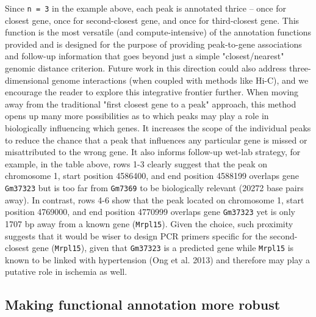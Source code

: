 \documentclass[12pt]{article}
\begin{document}
Since \texttt{n = 3} in the example above, each peak is annotated thrice -- once for closest gene, once for second-closest gene, and once for third-closest gene.  This function is the most versatile (and compute-intensive) of the annotation functions provided and is designed for the purpose of providing peak-to-gene associations and follow-up information that goes beyond just a simple "closest/nearest" genomic distance criterion.  Future work in this direction could also address three-dimensional genome interactions (when coupled with methods like Hi-C), and we encourage the reader to explore this integrative frontier further.  When moving away from the traditional "first closest gene to a peak" approach, this method opens up many more possibilities as to which peaks may play a role in biologically influencing which genes. It increases the scope of the individual peaks to reduce the chance that a peak that influences any particular gene is missed or misattributed to the wrong gene.  It also informs follow-up wet-lab strategy, for example, in the table above, rows 1-3 clearly suggest that the peak on chromosome 1, start position 4586400, and end position 4588199 overlaps gene \texttt{Gm37323} but is too far from \texttt{Gm7369} to be biologically relevant (20272 base pairs away).  In contrast, rows 4-6 show that the peak located on chromosome 1, start position 4769000, and end position 4770999 overlaps gene \texttt{Gm37323} yet is only 1707 bp away from a known gene (\texttt{Mrpl15}).  Given the choice, such proximity suggests that it would be wiser to design PCR primers specific for the second-closest gene (\texttt{Mrpl15}), given that \texttt{Gm37323} is a predicted gene while \texttt{Mrpl15} is known to be linked with hypertension (Ong et al. 2013) and therefore may play a putative role in ischemia as well.  

\subsection{Making functional annotation more robust}
\end{document}
